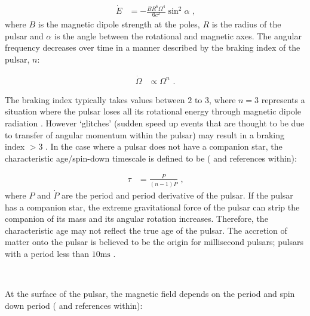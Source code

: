 \begin{equation}
    \begin{aligned}
    \dot{E}&=-\frac{BR^6\Omega^4}{6c^2}\sin^2\alpha\text{ ,}
    \end{aligned}
\end{equation}
where $B$ is the magnetic dipole strength at the poles, $R$ is the radius of the pulsar and $\alpha$ is the angle between the rotational and magnetic axes. The angular frequency decreases over time in a manner described by the braking index of the pulsar, $n$:

\begin{equation}
    \begin{aligned}
    \dot{\Omega} &\propto \Omega^n\text{ .}
    \end{aligned}
\end{equation}

The braking index typically takes values between $2\text{ to }3$, where $n=3$ represents a situation where the pulsar loses all its rotational energy through magnetic dipole radiation \citep{2007Ap&SS.308..317L}. However `glitches' (sudden speed up events that are thought to be due to transfer of angular momentum within the pulsar) may result in a braking index $>3$ \citep{2019MNRAS.489.3810P,2020MNRAS.494.2012P}. In the case where a pulsar does not have a companion star, the characteristic age/spin-down timescale is defined to be (\cite{2007ASSL..326.....H} and references within):

\begin{equation}
    \begin{aligned}
    \tau&=\frac{P}{(n-1)\dot{P}} \text{ ,}
    \end{aligned} \label{eq:chapter1_characteristic_age}
\end{equation}
\noindent where $P$ and $\dot{P}$ are the period and period derivative of the pulsar. If the pulsar has a companion star, the extreme gravitational force of the pulsar can strip the companion of its mass and its angular rotation increases. Therefore, the characteristic age may not reflect the true age of the pulsar. The accretion of matter onto the pulsar is believed to be the origin for millisecond pulsars; pulsars with a period less than $10\si{\milli\second}$ \citep{1982Natur.300..728A}.
\par~\par
At the surface of the pulsar, the magnetic field depends on the period and spin down period (\cite{2012hpa..book.....L} and references within):

